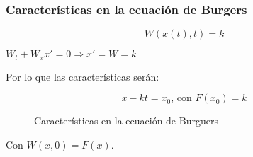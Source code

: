 		\subsubsection{Características en la ecuación de Burgers}

			$$W(x(t),t) = k$$

			$W_t + W_x x' = 0 \Rightarrow x' = W = k$

			Por lo que las características serán:

			$$x-kt = x_0 \text{, con }F(x_0) = k$$

			\begin{figure}[hbtp]
				\centering
				\caption{Características en la ecuación de Burguers}
				\label{fig:CaracteristicasBurger}
			\end{figure}

			Con $W(x,0) = F(x)$.

